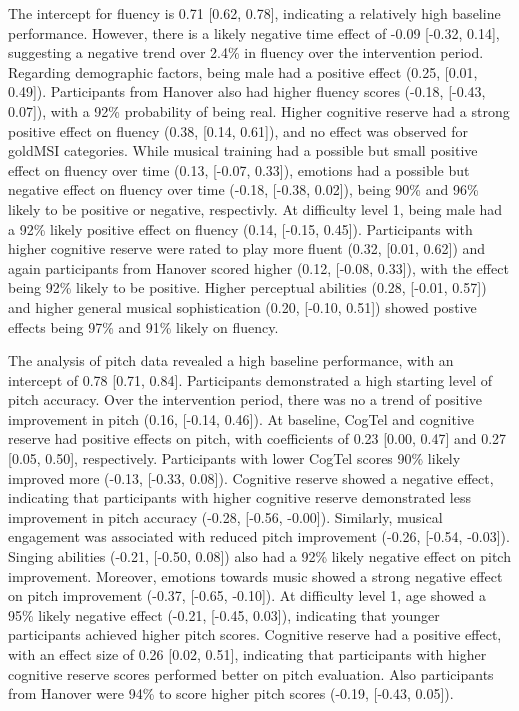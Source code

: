 The intercept for fluency is 0.71 [0.62, 0.78], indicating a relatively high baseline performance. However, there is a  likely negative time effect of -0.09 [-0.32, 0.14], suggesting a negative trend over 2.4\% in fluency over the intervention period.
Regarding demographic factors, being male had a positive effect (0.25, [0.01, 0.49]). Participants from Hanover also had higher fluency scores (-0.18, [-0.43, 0.07]), with a 92\% probability of being real. Higher cognitive reserve had a strong positive effect on fluency (0.38, [0.14, 0.61]), and no effect was observed for goldMSI categories.
While musical training had a possible but small positive effect on fluency over time (0.13, [-0.07, 0.33]), emotions had a possible but negative effect on fluency over time (-0.18, [-0.38, 0.02]), being 90\% and 96\% likely to be positive or negative, respectivly.
At difficulty level 1, being male had a 92\% likely positive effect on fluency (0.14, [-0.15, 0.45]). Participants with higher cognitive reserve were rated to play more fluent (0.32, [0.01, 0.62]) and again participants from Hanover scored higher (0.12, [-0.08, 0.33]), with the effect being 92\% likely to be positive. Higher perceptual abilities (0.28, [-0.01, 0.57]) and higher general musical sophistication (0.20, [-0.10, 0.51]) showed postive effects being 97\% and 91\% likely on fluency. 


The analysis of pitch data revealed a high baseline performance, with an intercept of 0.78 [0.71, 0.84]. Participants demonstrated a high starting level of pitch accuracy. Over the intervention period, there was no a trend of positive improvement in pitch (0.16, [-0.14, 0.46]).
At baseline, CogTel and cognitive reserve had positive effects on pitch, with coefficients of 0.23 [0.00, 0.47] and 0.27 [0.05, 0.50], respectively.
Participants with lower CogTel scores 90\% likely improved more (-0.13, [-0.33, 0.08]). Cognitive reserve showed a negative effect, indicating that participants with higher cognitive reserve demonstrated less improvement in pitch accuracy (-0.28, [-0.56, -0.00]). Similarly, musical engagement was associated with reduced pitch improvement (-0.26, [-0.54, -0.03]). Singing abilities (-0.21, [-0.50, 0.08]) also had a 92\% likely negative effect on pitch improvement. Moreover, emotions towards music showed a strong negative effect on pitch improvement (-0.37, [-0.65, -0.10]). 
At difficulty level 1, age showed a 95\% likely negative effect (-0.21, [-0.45, 0.03]), indicating that younger participants achieved higher pitch scores. Cognitive reserve had a positive effect, with an effect size of 0.26 [0.02, 0.51], indicating that participants with higher cognitive reserve scores performed better on pitch evaluation. Also participants from Hanover were 94\% to score higher pitch scores (-0.19, [-0.43, 0.05]).

